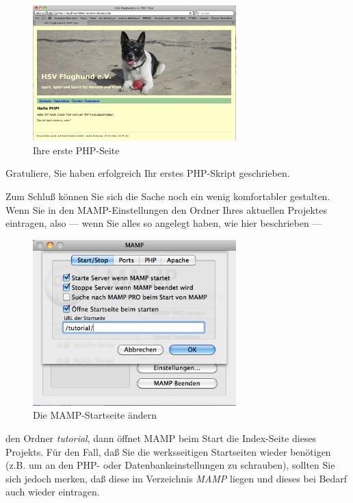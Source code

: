 \documentclass[11pt]{report}
\begin{document}
\begin{figure}[h!]
\centering
\includegraphics[width=0.7\textwidth]{./images/phptest01.png}
\caption{\label{phptest01}Ihre erste PHP-Seite}
\end{figure}


Gratuliere, Sie haben erfolgreich Ihr erstes PHP-Skript geschrieben.

Zum Schluß können Sie sich die Sache noch ein wenig komfortabler
gestalten. Wenn Sie in den MAMP-Einstellungen den Ordner Ihres
aktuellen Projektes eintragen, also — wenn Sie alles so angelegt
haben, wie hier beschrieben —

\begin{figure}[h!]
\centering
\includegraphics[width=0.7\textwidth]{./images/mamp04.png}
\caption{\label{mamp04}Die MAMP-Startseite ändern}
\end{figure}


den Ordner \emph{tutorial}, dann öffnet MAMP beim Start die Index-Seite
dieses Projekts. Für den Fall, daß Sie die werksseitigen Startseiten
wieder benötigen (z.B. um an den PHP- oder Datenbankeinstellungen zu
schrauben), sollten Sie sich jedoch merken, daß diese im Verzeichnis
\emph{MAMP} liegen und dieses bei Bedarf auch wieder eintragen.
\end{document}
